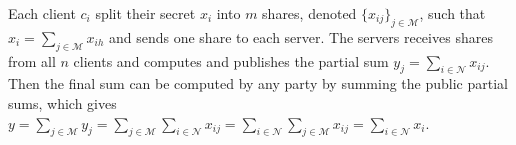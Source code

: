 Each client $c_i$ split their secret $x_i$ into $m$ shares, denoted $\{x_{ij}\}_{j\in\mathcal{M}}$, such that $x_i=\sum_{j\in\mathcal{M}}x_{ih}$ and sends one share to each server. The servers receives shares from all $n$ clients and computes and publishes the partial sum $y_j = \sum_{i\in\mathcal{N}} x_{ij} $. Then the final sum can be computed by any party by summing the public partial sums, which gives $y = \sum_{j\in\mathcal{M}} y_j = \sum_{j\in\mathcal{M}} \sum_{i\in\mathcal{N}} x_{ij} = \sum_{i\in\mathcal{N}} \sum_{j\in\mathcal{M}} x_{ij} =   \sum_{i\in\mathcal{N}}x_i$.


